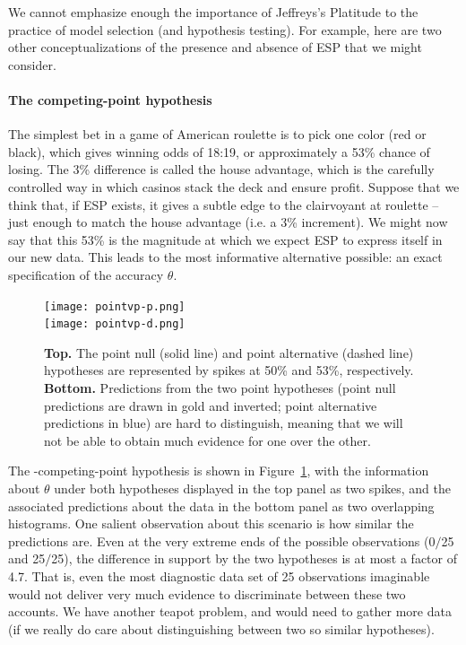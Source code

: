We cannot emphasize enough the importance of Jeffreys's Platitude to the practice of model selection (and hypothesis testing).  For example, here are two other conceptualizations of the presence and absence of ESP that we might consider.

\paragraph{The competing-point hypothesis} 
The simplest bet in a game of American roulette is to pick one color (red or black), which gives winning odds of 18:19, or approximately a 53\% chance of losing.  The 3\% difference is called the house advantage, which is the carefully controlled way in which casinos stack the deck and ensure profit. Suppose that we think that, if ESP exists, it gives a subtle edge to the clairvoyant at roulette -- just enough to match the house advantage (i.e. a 3\% increment). We might now say that this 53\% is the magnitude at which we expect ESP to express itself in our new data. This leads to the most informative alternative possible: an exact specification of the accuracy $\theta$. 

\begin{figure}[tb]
\texttt{[image: pointvp-p.png]}\\
\texttt{[image: pointvp-d.png]}
\caption{\textbf{Top.} The point null (solid line) and point alternative (dashed line) hypotheses are represented by spikes at 50\% and 53\%, respectively. \textbf{Bottom.} Predictions from the two point hypotheses (point null predictions are drawn in gold and inverted; point alternative predictions in blue) are hard to distinguish, meaning that we will not be able to obtain much evidence for one over the other.}\label{fig:v}
\end{figure}

The \hyp{competing-point hypothesis} is shown in Figure~\ref{fig:v}, with the information about $\theta$ under both hypotheses displayed in the top panel as two spikes, and the associated predictions about the data in the bottom panel as two overlapping histograms.  One salient observation about this scenario is how similar the predictions are.  Even at the very extreme ends of the possible observations (0$/$25 and 25$/$25), the difference in support by the two hypotheses is at most a factor of 4.7.  That is, even the most diagnostic data set of 25 observations imaginable would not deliver very much evidence to discriminate between these two accounts. We have another teapot problem, and would need to gather more data (if we really do care about distinguishing between two so similar hypotheses).

